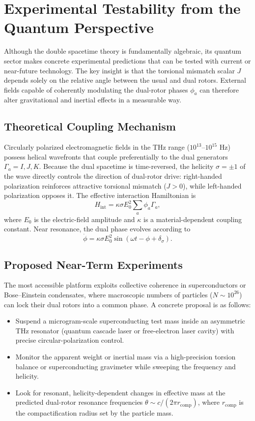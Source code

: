 \documentclass[dvipdfmx,11pt,a4paper]{article}
\begin{document}
\section{Experimental Testability from the Quantum Perspective}
\label{sec:experiments}

Although the double spacetime theory is fundamentally algebraic, its quantum sector makes concrete experimental predictions that can be tested with current or near-future technology. The key insight is that the torsional mismatch scalar $J$ depends solely on the relative angle between the usual and dual rotors. External fields capable of coherently modulating the dual-rotor phases $\phi_a$ can therefore alter gravitational and inertial effects in a measurable way.

\subsection{Theoretical Coupling Mechanism}

Circularly polarized electromagnetic fields in the THz range ($10^{13}$--$10^{15}$ Hz) possess helical wavefronts that couple preferentially to the dual generators $\Gamma_a = I, J, K$. Because the dual spacetime is time-reversed, the helicity $\sigma = \pm 1$ of the wave directly controls the direction of dual-rotor drive: right-handed polarization reinforces attractive torsional mismatch ($J > 0$), while left-handed polarization opposes it. The effective interaction Hamiltonian is
\[
H_\text{int} = \kappa \sigma E_0^2 \sum_a \phi_a \Gamma_a,
\]
where $E_0$ is the electric-field amplitude and $\kappa$ is a material-dependent coupling constant. Near resonance, the dual phase evolves according to
\[
\dot{\phi} = \kappa \sigma E_0^2 \sin(\omega t - \phi + \delta_\sigma).
\]

\subsection{Proposed Near-Term Experiments}

The most accessible platform exploits collective coherence in superconductors or Bose--Einstein condensates, where macroscopic numbers of particles ($N \sim 10^{26}$) can lock their dual rotors into a common phase. A concrete proposal is as follows:

\begin{itemize}
\item Suspend a microgram-scale superconducting test mass inside an asymmetric THz resonator (quantum cascade laser or free-electron laser cavity) with precise circular-polarization control.
\item Monitor the apparent weight or inertial mass via a high-precision torsion balance or superconducting gravimeter while sweeping the frequency and helicity.
\item Look for resonant, helicity-dependent changes in effective mass at the predicted dual-rotor resonance frequencies $\theta \sim c / (2\pi r_\text{comp})$, where $r_\text{comp}$ is the compactification radius set by the particle mass.
\end{itemize}
\end{document}
